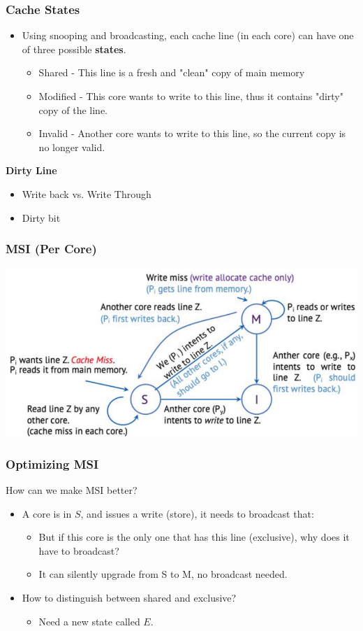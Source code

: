 \documentclass[10pt]{article}
\begin{document}
\subsubsection*{Cache States}
\begin{itemize}
    \item Using snooping and broadcasting, each cache line (in each core) can have one of three possible \textbf{states}.
    \begin{itemize}
        \item Shared - This line is a fresh and "clean" copy of main memory
        \item Modified - This core wants to write to this line, thus it contains "dirty" copy of the line.
        \item Invalid - Another core wants to write to this line, so the current copy is no longer valid.
    \end{itemize}
\end{itemize}
\textbf{Dirty Line}
\begin{itemize}
    \item Write back vs. Write Through
    \item Dirty bit
\end{itemize}
\subsubsection*{MSI (Per Core)}
\begin{center}
    \includegraphics*[scale=0.7]{W8_12.png}
\end{center}
\subsubsection*{Optimizing MSI}
How can we make MSI better?
\begin{itemize}
    \item A core is in $S$, and issues a write (store), it needs to broadcast that:
    \begin{itemize}
        \item But if this core is the only one that has this line (exclusive), why does it have to broadcast?
        \item It can silently upgrade from S to M, no broadcast needed.
    \end{itemize}
    \item How to distinguish between shared and exclusive?
    \begin{itemize}
        \item Need a new state called $E$.
    \end{itemize}
\end{itemize}
\end{document}
